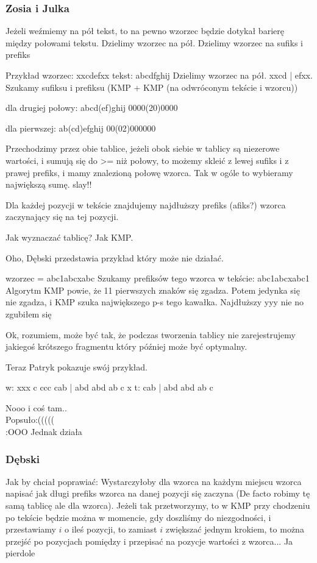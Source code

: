 \subsubsection{Zosia i Julka}
Jeżeli weźmiemy na pół tekst, to na pewno wzorzec będzie dotykał barierę między połowami tekstu. Dzielimy wzorzec na pół. Dzielimy wzorzec na sufiks i prefiks

Przykład
wzorzec: xxcdefxx
tekst: abcdfghij
Dzielimy wzorzec na pół. xxcd | efxx. Szukamy sufiksu i prefiksu (KMP + KMP (na odwróconym tekście i wzorcu))

dla drugiej połowy:
abcd(ef)ghij
0000(20)0000

dla pierwszej:
ab(cd)efghij
00(02)000000

Przechodzimy przez obie tablice, jeżeli obok siebie w tablicy są niezerowe wartości, i sumują się do >= niż połowy, to możemy skleić z lewej sufiks i z prawej prefiks, i mamy znalezioną połowę wzorca. Tak w ogóle to wybieramy największą sumę.
slay!!

Dla każdej pozycji w tekście znajdujemy najdłuższy prefiks (afiks?) wzorca zaczynający się na tej pozycji. 

Jak wyznaczać tablicę? Jak KMP. 

Oho, Dębski przedstawia przykład który może nie działać.

wzorzec = abc1abcxabc
Szukamy prefiksów tego wzorca w tekście: abc1abcxabc1
Algorytm KMP powie, że 11 pierwszych znaków się zgadza. Potem jedynka się nie zgadza, i KMP szuka największego p-s tego kawałka. Najdłuższy yyy nie no zgubiłem się

Ok, rozumiem, może być tak, że podczas tworzenia tablicy nie zarejestrujemy jakiegoś krótszego fragmentu który później może być optymalny.

Teraz Patryk pokazuje swój przykład.

w: xxx c ccc cab | abd abd ab c x
t:           cab | abd abd ab c

Nooo i coś tam..\\
Popsuło:(((((\\
:OOO Jednak działa

\subsubsection{Dębski}
Jak by chciał poprawiać: Wystarczyłoby dla wzorca na każdym miejscu wzorca napisać jak długi prefiks wzorca na danej pozycji się zaczyna (De facto robimy tę samą tablicę ale dla wzorca). Jeżeli tak przetworzymy, to w KMP przy chodzeniu po tekście będzie można w momencie, gdy doszliśmy do niezgodności, i przestawiamy $i$ o ileś pozycji, to zamiast $i$ zwiększać jednym krokiem, to można przejść po pozycjach pomiędzy i przepisać na pozycje wartości z wzorca... Ja pierdole

